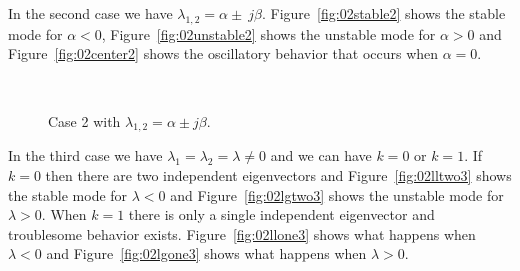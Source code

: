 In the second case we have $\lambda_{1,2}=\alpha\pm\ j\beta$.
Figure~\ref{fig:02stable2} shows the stable mode for $\alpha<0$, Figure~\ref{fig:02unstable2} shows the unstable mode for $\alpha>0$ and Figure~\ref{fig:02center2} shows the oscillatory behavior that occurs when $\alpha=0$.

\begin{figure}[ht!]
\centering
{} \hfill
{} \\
\caption{Case 2 with $\lambda_{1,2} = \alpha\pm j\beta$.}
\label{fig:02case2}
\end{figure}

In the third case we have $\lambda_1=\lambda_2=\lambda\neq0$ and we can have $k=0$ or $k=1$.
If $k=0$ then there are two independent eigenvectors and Figure~\ref{fig:02lltwo3} shows the stable mode for $\lambda<0$ and Figure~\ref{fig:02lgtwo3} shows the unstable mode for $\lambda>0$.
When $k=1$ there is only a single independent eigenvector and troublesome behavior exists.
Figure~\ref{fig:02llone3} shows what happens when $\lambda<0$ and Figure~\ref{fig:02lgone3} shows what happens when $\lambda>0$.

